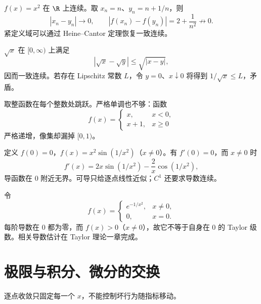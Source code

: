 \begin{description}[style=nextline,leftmargin=2.8em]
 \item[连续不推出一致连续]
 \(f(x)=x^2\) 在 \(\R\) 上连续。取 \(x_n=n\)、\(y_n=n+1/n\)，则
 \[
  |x_n-y_n|\to0,\qquad
  |f(x_n)-f(y_n)|=2+\frac1{n^2}\not\to0.
 \]
 紧定义域可以通过 Heine--Cantor 定理恢复一致连续。

 \item[一致连续不推出 Lipschitz]
 \(\sqrt{x}\) 在 \([0,\infty)\) 上满足
 \[
  |\sqrt{x}-\sqrt{y}|\le\sqrt{|x-y|},
 \]
 因而一致连续。若存在 Lipschitz 常数 \(L\)，令 \(y=0\)、\(x\downarrow0\) 将得到
 \(1/\sqrt{x}\le L\)，矛盾。

 \item[单调不推出连续]
 取整函数在每个整数处跳跃。严格单调也不够：函数
 \[
 f(x)=
 \begin{cases}
 x,&x<0,\\
 x+1,&x\ge0
 \end{cases}
 \]
 严格递增，像集却漏掉 \([0,1)\)。

 \item[可导不推出导数连续]
 定义 \(f(0)=0\)，\(f(x)=x^2\sin(1/x^2)\)（\(x\ne0\)）。有
 \(f'(0)=0\)，而 \(x\ne0\) 时
 \[
 f'(x)=2x\sin(1/x^2)-\frac2x\cos(1/x^2),
 \]
 导函数在 \(0\) 附近无界。可导只给逐点线性近似；\(C^1\) 还要求导数连续。

 \item[光滑不推出解析]
 令
 \[
 f(x)=
 \begin{cases}
 e^{-1/x^2},&x\ne0,\\
 0,&x=0.
 \end{cases}
 \]
 每阶导数在 \(0\) 都为零，而 \(f(x)>0\)（\(x\ne0\)），故它不等于自身在 \(0\) 的 Taylor 级数。相关导数估计在 Taylor 理论一章完成。
\end{description}

\section{极限与积分、微分的交换}

逐点收敛只固定每一个 \(x\)，不能控制坏行为随指标移动。

